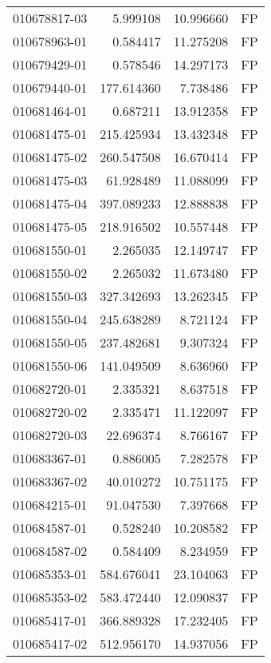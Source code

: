 \begin{tabular}{lrrl}
010678817-03 &    5.999108 &      10.996660 &   FP \\
010678963-01 &    0.584417 &      11.275208 &   FP \\
010679429-01 &    0.578546 &      14.297173 &   FP \\
010679440-01 &  177.614360 &       7.738486 &   FP \\
010681464-01 &    0.687211 &      13.912358 &   FP \\
010681475-01 &  215.425934 &      13.432348 &   FP \\
010681475-02 &  260.547508 &      16.670414 &   FP \\
010681475-03 &   61.928489 &      11.088099 &   FP \\
010681475-04 &  397.089233 &      12.888838 &   FP \\
010681475-05 &  218.916502 &      10.557448 &   FP \\
010681550-01 &    2.265035 &      12.149747 &   FP \\
010681550-02 &    2.265032 &      11.673480 &   FP \\
010681550-03 &  327.342693 &      13.262345 &   FP \\
010681550-04 &  245.638289 &       8.721124 &   FP \\
010681550-05 &  237.482681 &       9.307324 &   FP \\
010681550-06 &  141.049509 &       8.636960 &   FP \\
010682720-01 &    2.335321 &       8.637518 &   FP \\
010682720-02 &    2.335471 &      11.122097 &   FP \\
010682720-03 &   22.696374 &       8.766167 &   FP \\
010683367-01 &    0.886005 &       7.282578 &   FP \\
010683367-02 &   40.010272 &      10.751175 &   FP \\
010684215-01 &   91.047530 &       7.397668 &   FP \\
010684587-01 &    0.528240 &      10.208582 &   FP \\
010684587-02 &    0.584409 &       8.234959 &   FP \\
010685353-01 &  584.676041 &      23.104063 &   FP \\
010685353-02 &  583.472440 &      12.090837 &   FP \\
010685417-01 &  366.889328 &      17.232405 &   FP \\
010685417-02 &  512.956170 &      14.937056 &   FP \\

\end{tabular}
